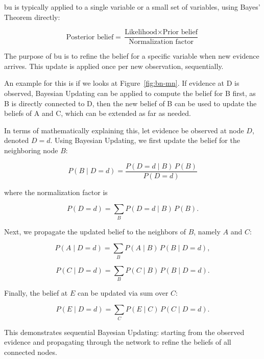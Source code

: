 \documentclass[12pt,a4paper]{article}
\begin{document}
\acs{bu} is typically applied to a single variable or a small set of variables, using Bayes' Theorem directly: 

\begin{equation}
\text{Posterior belief} = \frac{\text{Likelihood} \times \text{Prior belief}}{\text{Normalization factor}}
\end{equation}

The purpose of \acs{bu} is to refine the belief for a specific variable when new evidence arrives. This update is applied once per new observation, sequentially.

An example for this is if we looks at Figure~\ref{fig:bn-mn}. If evidence at D is observed, Bayesian Updating can be applied to compute the belief for B first, as B is directly connected to D, then the new belief of B can be used to update the beliefs of A and C, which can be extended as far as needed. 

In terms of mathematically explaining this, let evidence be observed at node $D$, denoted $D=d$. Using Bayesian Updating, we first update the belief for the neighboring node $B$:

\begin{equation}
P(B \mid D=d) = \frac{P(D=d \mid B) \, P(B)}{P(D=d)}
\end{equation}

where the normalization factor is

\begin{equation}
P(D=d) = \sum_B P(D=d \mid B) \, P(B).
\end{equation}


Next, we propagate the updated belief to the neighbors of $B$, namely $A$ and $C$:

\begin{equation}
P(A \mid D=d) = \sum_B P(A \mid B) \, P(B \mid D=d),
\end{equation}


\begin{equation}
P(C \mid D=d) = \sum_B P(C \mid B) \, P(B \mid D=d).
\end{equation}

Finally, the belief at $E$ can be updated via \acs{sum} over $C$:

\begin{equation}
P(E \mid D=d) = \sum_C P(E \mid C) \, P(C \mid D=d).
\end{equation}

This demonstrates sequential Bayesian Updating: starting from the observed evidence and propagating through the network to refine the beliefs of all connected nodes.
\end{document}
